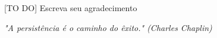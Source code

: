 \begin{agradecimentos}

[TO DO] Escreva seu agradecimento

\end{agradecimentos}

\begin{epigrafe}
    \vspace*{\fill}
	\begin{flushright}
		\textit{"A persistência é o caminho do êxito." (Charles Chaplin)}
	\end{flushright}
\end{epigrafe}


